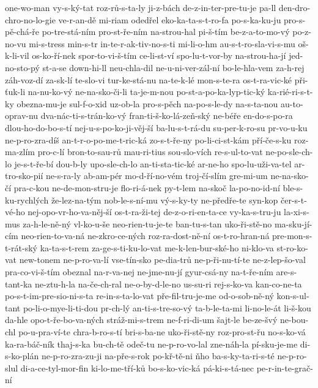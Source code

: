 one-wo-man
vy-s-ký-tat
roz-rů-s-ta-ly
ji-z-bách
de-z-in-ter-pre-tu-je
pa-ll
den-dro-chro-no-lo-gie
ve-r-an-dě
mi-riam
odedřel
eko-ka-ta-s-t-ro-fa
po-s-ka-ku-ju
pro-s-pě-chá-ře
po-tre-stá-ním
pro-st-ře-ním
na-strou-hal
pi-š-tím
be-z-a-to-mo-vý
po-z-no-vu
mi-s-tress
min-s-tr
in-te-r-ak-tiv-no-s-ti
mi-li-o-hm
au-s-t-ro-sla-vi-s-mu
oš-k-li-vil
os-ko-ří-nek
spor-to-vi-š-tím
ce-li-st-ví
spo-lu-t-vor-by
na-strou-ha-jí
jed-no-sto-pý
st-a-se
down-hi-ll
neu-chla-dil
ne-u-ni-ver-zál-ní
bo-le-hla-vem
za-h-rej
záh-voz-dí
za-sk-lí
te-slo-vi
tur-ke-stá-nu
na-te-k-lé
mon-s-te-ra
os-t-ra-vic-ké
při-ťuk-li
na-nu-ko-vý
ne-na-sko-či-li
ta-je-m-nou
po-st-a-po-ka-lyp-tic-ký
ka-rié-ri-s-t-ky
obezna-mu-je
sul-f-o-xid
uz-ob-la
pro-s-pěch
na-po-s-le-dy
na-s-ta-nou
au-to-oprav-nu
dva-nác-ti-s-trán-ko-vý
fran-ti-š-ko-lá-zeň-ský
ne-béře
en-do-s-po-ra
dlou-ho-do-bo-s-tí
nej-u-s-po-ko-ji-věj-ší
ba-lu-s-t-rá-du
su-per-k-ro-su
pr-vo-u-ku
ne-p-ro-zra-díš
an-t-r-o-po-me-t-ric-ká
zo-s-t-ře-ny
po-li-ci-st-kám
pří-če-s-ku
roz-ma-zlím
pro-c-lí
bron-to-sau-rů
mau-ri-tius
sou-slo-vích
re-s-ul-to-vat
ne-po-sle-ch-lo
je-s-t-ře-bí
dou-b-ly
upo-sle-ch-lo
an-ti-sta-tic-ké
ar-ne-ho
spo-lu-uži-va-tel
ar-tro-sko-pií
ne-s-ra-ly
ab-am-pér
mo-d-ří-no-vém
troj-čí-slím
gre-mi-um
ne-na-sko-čí
pra-c-kou
ne-de-mon-stru-je
flo-ri-á-nek
py-t-lem
na-skoč
la-po-no-id-ní
ble-s-ku-rychlých
že-lez-na-tým
nob-le-s-ní-mu
vý-s-ky-ty
ne-předře-te
syn-kop
čer-s-t-vé-ho
nej-opo-vr-ho-va-něj-ší
os-t-ra-ži-tej
de-z-o-ri-en-ta-ce
vy-ka-s-tru-ju
la-xi-s-mus
za-h-le-ně-ný
vl-ko-u-še
neo-rien-tu-je-te
ban-tu-s-tan
uko-ři-stě-no
ma-sku-jí-cím
neo-rien-to-va-ná
ne-zkro-ce-ných
roz-ra-dost-ně-ní
os-t-ro-hran-ná
pre-mon-s-t-rát-ský
ka-ta-s-t-rem
za-ge-s-ti-ku-lo-vat
me-k-len-bur-ské-ho
ni-klo-va
st-ro-ko-vat
new-tonem
ne-p-ro-va-lí
vse-tín-sko
pe-dia-trů
ne-p-ři-nu-tí-te
ne-z-lep-šo-val
pra-co-vi-š-tím
obeznal
na-r-va-nej
ne-jme-nu-jí
gyur-csá-ny
na-t-ře-ním
are-s-tant-ka
ne-ztu-h-la
na-če-ch-ral
ne-o-by-d-le-no
us-su-ri
rej-s-ko-va
kan-co-ne-ta
po-s-t-im-pre-sio-ni-s-ta
re-in-s-ta-lo-vat
pře-fil-tru-je-me
od-o-sob-ně-ný
kon-s-ul-tant
po-li-o-mye-li-ti-dou
pr-ch-lý
an-ti-s-tre-so-vý
ta-b-le-ta-mi
li-no-le-át
li-š-kou
da-hle
opo-t-ře-bo-va-ných
stráž-mi-s-trem
ne-f-ri-di-um
šajt-le
be-ze-švý
ne-bou-chl
po-u-pra-ví-te
chra-b-ro-s-tí
bri-s-ba-ne
uko-ři-stě-ny
roz-pro-st-řu
no-s-ko-vá
ka-ra-báč-ník
thaj-s-ka
bu-ch-tě
odeč-tu
ne-p-ro-vo-lal
zne-náh-la
pí-sku-je-me
di-s-ko-plán
ne-p-ro-zra-zu-ji
na-pře-s-rok
po-kř-tě-ni
ňho
ba-s-ky-ta-ri-s-té
ne-p-ro-slul
di-a-ce-tyl-mor-fin
ki-lo-me-tří-ků
bo-s-ko-vic-ká
pá-ki-s-tá-nec
pe-r-in-te-grač-ní
